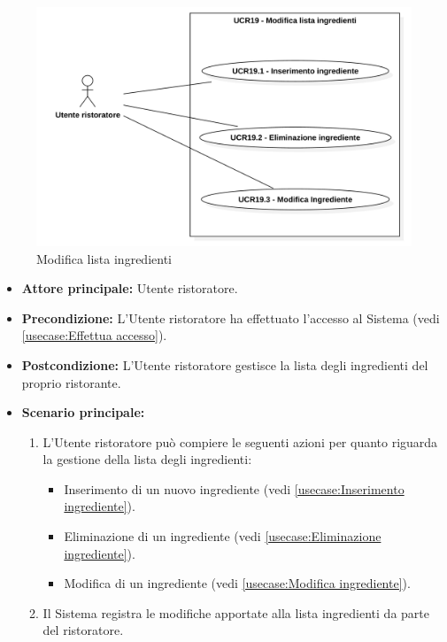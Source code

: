\label{usecase:Modifica lista ingredienti}

\begin{figure}[h]
	\centering
	\includegraphics[width=0.9999\textwidth]{./uml/UCR19.png} 
	\caption{Modifica lista ingredienti}
	\label{fig:UCR19}
  \end{figure}

\begin{itemize}
	\item \textbf{Attore principale:} Utente ristoratore.

	\item \textbf{Precondizione:} L'Utente ristoratore ha effettuato l'accesso al Sistema (vedi \autoref{usecase:Effettua accesso}).

	\item \textbf{Postcondizione:} L'Utente ristoratore gestisce la lista degli ingredienti del proprio ristorante.


	\item \textbf{Scenario principale:}
	      \begin{enumerate}

		      \item L'Utente ristoratore può compiere le seguenti azioni per quanto riguarda la gestione della lista degli ingredienti:
		      \begin{itemize}
                \item Inserimento di un nuovo ingrediente (vedi \autoref{usecase:Inserimento ingrediente}).
                \item Eliminazione di un ingrediente (vedi \autoref{usecase:Eliminazione ingrediente}).
                \item Modifica di un ingrediente (vedi \autoref{usecase:Modifica ingrediente}).
              \end{itemize}
		      \item Il Sistema registra le modifiche apportate alla lista ingredienti da parte del ristoratore.

	      \end{enumerate}
\end{itemize}

